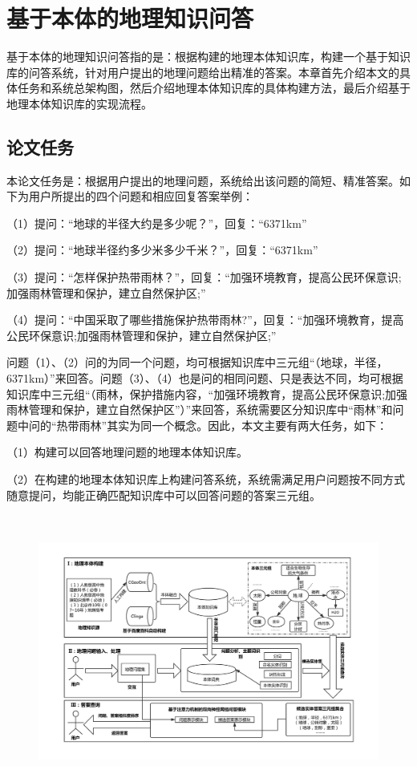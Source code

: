\chapter{基于本体的地理知识问答}\label{chapter:al_sup}
基于本体的地理知识问答指的是：根据构建的地理本体知识库，构建一个基于知识库的问答系统，针对用户提出的地理问题给出精准的答案。本章首先介绍本文的具体任务和系统总架构图，然后介绍地理本体知识库的具体构建方法，最后介绍基于地理本体知识库的实现流程。

\section{论文任务}
本论文任务是：根据用户提出的地理问题，系统给出该问题的简短、精准答案。如下为用户所提出的四个问题和相应回复答案举例：

（1）提问：“地球的半径大约是多少呢？”，回复：“6371km”

（2）提问：“地球半径约多少米多少千米？”，回复：“6371km”

（3）提问：“怎样保护热带雨林？”，回复：“加强环境教育，提高公民环保意识;加强雨林管理和保护，建立自然保护区;”

（4）提问：“中国采取了哪些措施保护热带雨林?”，回复：“加强环境教育，提高公民环保意识;加强雨林管理和保护，建立自然保护区;”

问题（1）、（2）问的为同一个问题，均可根据知识库中三元组“（地球，半径，6371km）”来回答。问题（3）、（4）也是问的相同问题、只是表达不同，均可根据知识库中三元组“（雨林，保护措施内容，“加强环境教育，提高公民环保意识;加强雨林管理和保护，建立自然保护区”）”来回答，系统需要区分知识库中“雨林”和问题中问的“热带雨林”其实为同一个概念。因此，本文主要有两大任务，如下：

（1）构建可以回答地理问题的地理本体知识库。

（2）在构建的地理本体知识库上构建问答系统，系统需满足用户问题按不同方式随意提问，均能正确匹配知识库中可以回答问题的答案三元组。

\begin{figure}[!htb]
	\centering\includegraphics[height=9cm]{resource/graduation}
	\label{fig:graduation}
\end{figure}

